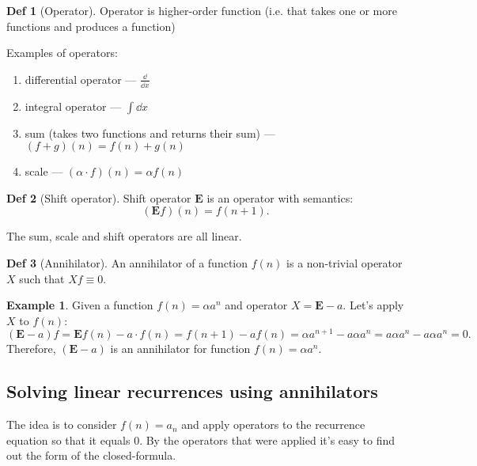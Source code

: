 \documentclass[a4paper]{article}
\theoremstyle{definition}
\newtheorem{definition}{Def}
\newtheorem{example}{Example}[section]
\begin{document}
\begin{definition}[Operator]
  Operator is higher-order function (i.e. that takes one or more functions and
  produces a function)
\end{definition}
Examples of operators:
\begin{enumerate}
  \item differential operator --- \(\frac{\dd}{\dd x}\)
  \item integral operator --- \(\int \dd x\)
  \item sum (takes two functions and returns their sum) ---
    \((f + g)(n) = f(n) + g(n)\)
  \item scale --- \((\alpha \cdot f)(n) = \alpha f(n)\)
\end{enumerate}
\newcommand\EE{\boldsymbol{E}}
\begin{definition}[Shift operator]
  Shift operator \(\EE\) is an operator with semantics:
   \[
    (\EE f)(n) = f(n + 1)
  .\]
\end{definition}
The sum, scale and shift operators are all linear.
\begin{definition}[Annihilator]
  An annihilator of a function \(f(n)\)
  is a non-trivial operator \(X\)
  such that \(Xf \equiv 0\).
\end{definition}
\begin{example}
  Given a function \(f(n) = \alpha a^n\) and operator  \(X = \EE - a\).
  Let's apply \(X\) to \(f(n)\):
   \[
     (\EE - a)f = \EE f(n) - a \cdot f(n) = f(n + 1) - a f(n)
     = \alpha a^{n + 1} - a \alpha a^n
     = a \alpha a^n - a \alpha a^n = 0
  .\]
  Therefore, \((\EE - a)\) is an annihilator for function  \(f(n) = \alpha a^n\).
\end{example}

\subsection{Solving linear recurrences using annihilators}

The idea is to consider \(f(n) = a_n\) and
apply operators to the recurrence equation so that it equals 0.
By the operators that were applied it's easy to find out
the form of the closed-formula.
\end{document}
